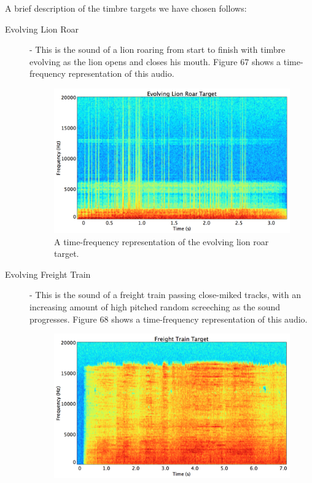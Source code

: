 \documentclass[12pt]{report} 	%
\numberwithin{figure}{chapter}
\numberwithin{table}{chapter}
\numberwithin{equation}{chapter}
\begin{document}
\begin{flushleft}
A brief description of the timbre targets we have chosen follows:
\begin{description}
\item[Evolving Lion Roar] - This is the sound of a lion roaring from start to finish with timbre evolving as the lion opens and closes his mouth. Figure 67 shows a time-frequency representation of this audio.
\begin{figure}[h!]
\begin{center}
\includegraphics[scale=0.34]{EvolvingLionRoarTargetSTFT}
\caption[Evolving lion roar time-frequency representation]{A time-frequency representation of the evolving lion roar target.}
\end{center}
\vspace{24pt}
\end{figure}
\item[Evolving Freight Train] - This is the sound of a freight train passing close-miked tracks, with an increasing amount of high pitched random screeching as the sound progresses. Figure 68 shows a time-frequency representation of this audio.
\begin{figure}[h!]
\begin{center}
\includegraphics[scale=0.34]{FreightTrainTargetSTFT}

\end{center}
\end{figure}
\end{description}
\end{flushleft}
\end{document}
